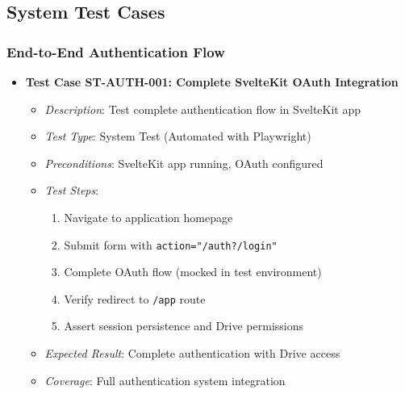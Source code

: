 \documentclass[12pt]{article}
\begin{document}
\subsection{System Test Cases}

\subsubsection{End-to-End Authentication Flow}
\begin{itemize}
  \item \textbf{Test Case ST-AUTH-001: Complete SvelteKit OAuth Integration}
    \begin{itemize}
      \item \textit{Description}: Test complete authentication flow in SvelteKit app
      \item \textit{Test Type}: System Test (Automated with Playwright)
      \item \textit{Preconditions}: SvelteKit app running, OAuth configured
      \item \textit{Test Steps}:
        \begin{enumerate}
          \item Navigate to application homepage
          \item Submit form with \texttt{action="/auth?/login"}
          \item Complete OAuth flow (mocked in test environment)
          \item Verify redirect to \texttt{/app} route
          \item Assert session persistence and Drive permissions
        \end{enumerate}
      \item \textit{Expected Result}: Complete authentication with Drive access
      \item \textit{Coverage}: Full authentication system integration
    \end{itemize}
\end{itemize}
\end{document}
